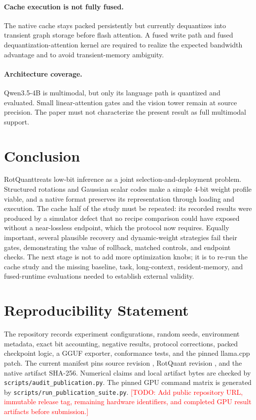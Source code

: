 \documentclass[10pt,twocolumn]{article}
\newcommand{\method}{RotQuant}
\newcommand{\todo}[1]{\textcolor{red}{[TODO: #1]}}
\begin{document}
\paragraph{Cache execution is not fully fused.}
The native cache stays packed persistently but currently dequantizes into
transient graph storage before flash attention. A fused write path and fused
dequantization-attention kernel are required to realize the expected bandwidth
advantage and to avoid transient-memory ambiguity.

\paragraph{Architecture coverage.}
Qwen3.5-4B is multimodal, but only its language path is quantized and evaluated.
Small linear-attention gates and the vision tower remain at source precision.
The paper must not characterize the present result as full multimodal support.

\section{Conclusion}

\method treats low-bit inference as a joint selection-and-deployment problem.
Structured rotations and Gaussian scalar codes make a simple 4-bit weight
profile viable, and a native format preserves its representation through
loading and execution. The cache half of the study must be repeated: its
recorded results were produced by a simulator defect that no recipe comparison
could have exposed without a near-lossless endpoint, which the protocol now
requires. Equally important, several plausible recovery and dynamic-weight
strategies fail their gates, demonstrating the value of rollback, matched
controls, and endpoint checks. The next stage is not to add more optimization
knobs; it is to re-run the cache study and the missing baseline, task,
long-context, resident-memory, and fused-runtime evaluations needed to
establish external validity.

\section*{Reproducibility Statement}

The repository records experiment configurations, random seeds, environment
metadata, exact bit accounting, negative results, protocol corrections, packed
checkpoint logic, a GGUF exporter, conformance tests, and the pinned llama.cpp
patch. The current manifest pins source revision \SourceRevision{}, RotQuant
revision \RotQuantRevision{}, and the native artifact SHA-256. Numerical claims
and local artifact bytes are checked by
\texttt{scripts/audit\_publication.py}.
The pinned GPU command matrix is generated by
\texttt{scripts/run\_publication\_suite.py}. \todo{Add public repository URL,
immutable release tag, remaining hardware identifiers, and completed GPU result
artifacts before submission.}
\end{document}
